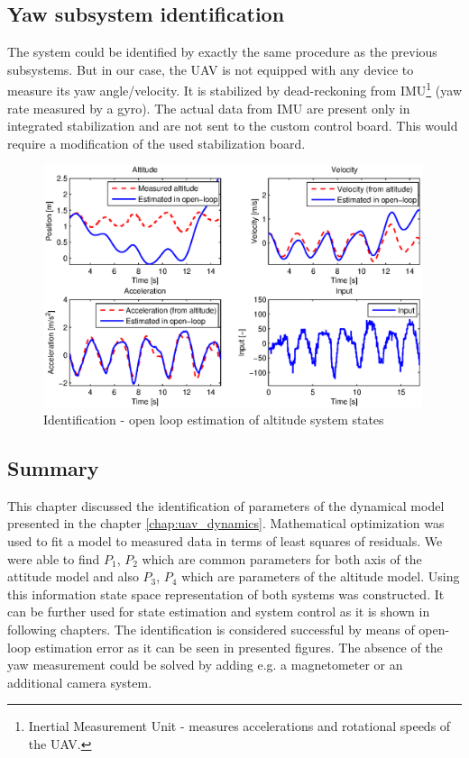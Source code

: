 \subsection{Yaw subsystem identification}

The system could be identified by exactly the same procedure as the previous subsystems. But in our case, the UAV is not equipped with any device to measure its yaw angle/velocity. It is stabilized by dead-reckoning from IMU\footnote{Inertial Measurement Unit - measures accelerations and rotational speeds of the UAV.} (yaw rate measured by a gyro). The actual data from IMU are present only in integrated stabilization and are not sent to the custom control board. This would require a modification of the used stabilization board.

\begin{figure}[h]
\includegraphics[width=0.99\textwidth]{fig/iden4.eps} 
\caption{Identification - open loop estimation of altitude system states}
\label{fig:iden4}
\end{figure}

\subsection{Summary}

This chapter discussed the identification of parameters of the dynamical model presented in the chapter \ref{chap:uav_dynamics}. Mathematical optimization was used to fit a model to measured data in terms of least squares of residuals. We were able to find $P_1$, $P_2$ which are common parameters for both axis of the attitude model and also $P_3$, $P_4$ which are parameters of the altitude model. Using this information state space representation of both systems was constructed. It can be further used for state estimation and system control as it is shown in following chapters. The identification is considered successful by means of open-loop estimation error as it can be seen in presented figures. The absence of the yaw measurement could be solved by adding e.g. a magnetometer or an additional camera system.